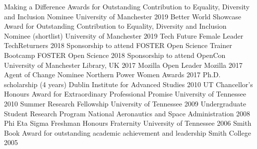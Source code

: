 \begin{cvpress}
 \cvpres
    {Making a Difference Awards for Outstanding Contribution to Equality, Diversity and Inclusion Nominee}
    {University of Manchester}
    {2019}
 \cvpres
    {Better World Showcase Award for Outstanding Contribution to Equality, Diversity and Inclusion Nominee (shortlist)}
    {University of Manchester}
    {2019}
 \cvpres
    {Tech Future Female Leader}
    {TechReturners}
    {2018}
 \cvpres
    {Sponsorship to attend FOSTER Open Science Trainer Bootcamp}
    {FOSTER Open Science}
    {2018}
 \cvpres
    {Sponsorship to attend OpenCon}
    {University of Manchester Library, UK}
    {2017}
 \cvpres
    {Mozilla Open Leader}
    {Mozilla}
    {2017}
  \cvpres
    {Agent of Change Nominee}
    {Northern Power Women Awards}
    {2017}  
    \cvpres
    {Ph.D. scholarship (4 years)}
    {Dublin Institute for Advanced Studies}
    {2010}
  \cvpres
    {UT Chancellor's Honours Award for Extraordinary Professional Promise}
    {University of Tennessee}
    {2010}
  \cvpres
    {Summer Research Fellowship}
    {University of Tennessee}
    {2009}
  \cvpres
    {Undergraduate Student Research Program}
    {National Aeronautics and Space Administration}
    {2008}
  \cvpres
    {Phi Eta Sigma Freshman Honours Fraternity}
    {University of Tennessee}
    {2006}
  \cvpres
    {Smith Book Award for outstanding academic achievement and leadership}
    {Smith College}
    {2005}
\end{cvpress}


